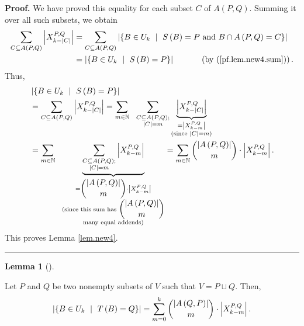 \documentclass[numbers=enddot,12pt,final,onecolumn,notitlepage]{scrartcl}%
\theoremstyle{definition}
\newtheorem{lem}[theo]{Lemma}
\newenvironment{lemma}[1][]
{\begin{lem}[#1]\begin{leftbar}}
{\end{leftbar}\end{lem}}
\newenvironment{proof}[1][Proof]{\noindent\textbf{#1.} }{\ \rule{0.5em}{0.5em}}
\let\sumnonlimits\sum
\renewcommand{\sum}{\sumnonlimits\limits}
\theoremstyle{plainsl}
\begin{document}
\begin{proof}
We have proved this equality for each subset $C$ of $A\left(  P,Q\right)  $.
Summing it over all such subsets, we obtain%
\begin{align*}
\sum_{C\subseteq A\left(  P,Q\right)  }\left\vert X_{k-|C|}^{P,Q}\right\vert
&  =\sum_{C\subseteq A\left(  P,Q\right)  }\left\vert \left\{  B\in
U_{k}\ \mid\ S\left(  B\right)  =P\text{ and }B\cap A\left(  P,Q\right)
=C\right\}  \right\vert \\
&  =\left\vert \left\{  B\in U_{k}\ \mid\ S\left(  B\right)  =P\right\}
\right\vert \ \ \ \ \ \ \ \ \ \ \left(  \text{by (\ref{pf.lem.new4.sum}%
)}\right)  .
\end{align*}
Thus,%
\begin{align*}
&  \left\vert \left\{  B\in U_{k}\ \mid\ S\left(  B\right)  =P\right\}
\right\vert \\
&  =\sum_{C\subseteq A\left(  P,Q\right)  }\left\vert X_{k-|C|}^{P,Q}%
\right\vert =\sum_{m\in\mathbb{N}}\ \ \sum_{\substack{C\subseteq A\left(
P,Q\right)  ;\\\left\vert C\right\vert =m}}\underbrace{\left\vert
X_{k-|C|}^{P,Q}\right\vert }_{\substack{=\left\vert X_{k-m}^{P,Q}\right\vert
\\\text{(since }\left\vert C\right\vert =m\text{)}}}\\
&  =\sum_{m\in\mathbb{N}}\ \ \underbrace{\sum_{\substack{C\subseteq A\left(
P,Q\right)  ;\\\left\vert C\right\vert =m}}\left\vert X_{k-m}^{P,Q}\right\vert
}_{\substack{=\dbinom{\left\vert A\left(  P,Q\right)  \right\vert }{m}%
\cdot\left\vert X_{k-m}^{P,Q}\right\vert \\\text{(since this sum has }%
\dbinom{\left\vert A\left(  P,Q\right)  \right\vert }{m}\\\text{many equal
addends)}}}=\sum_{m\in\mathbb{N}}\dbinom{\left\vert A\left(  P,Q\right)
\right\vert }{m}\cdot\left\vert X_{k-m}^{P,Q}\right\vert .
\end{align*}
This proves Lemma \ref{lem.new4}.
\end{proof}

\begin{lemma}
\label{lem.new5} Let $P$ and $Q$ be two nonempty subsets of $V$ such that
$V=P\sqcup Q$. Then,%
\[
\left\vert \left\{  B\in U_{k}\ \mid\ T\left(  B\right)  =Q\right\}
\right\vert =\sum_{m=0}^{k}\dbinom{\left\vert A\left(  Q,P\right)  \right\vert
}{m}\cdot\left\vert X_{k-m}^{P,Q}\right\vert .
\]

\end{lemma}
\end{document}
